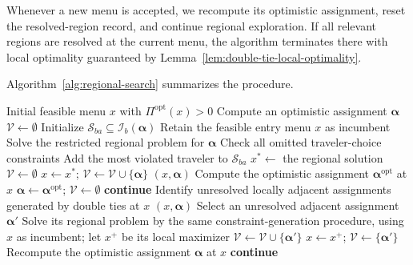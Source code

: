 \documentclass{article}
\begin{document}
Whenever a new menu is accepted, we recompute its optimistic assignment,
reset the resolved-region record, and continue regional exploration.
If all relevant regions are resolved at the current menu, the algorithm
terminates there with local optimality guaranteed by
Lemma~\ref{lem:double-tie-local-optimality}.

Algorithm~\ref{alg:regional-search} summarizes the procedure.

\begin{algorithm}[t]
\caption{Regional search under optimistic selection}
\label{alg:regional-search}
\begin{algorithmic}[1]
\Require Initial feasible menu $x$ with $\Pi^{\mathrm{opt}}(x)>0$
\State Compute an optimistic assignment $\bm\alpha$
\State $\mathcal V\gets\emptyset$ 
        \State Initialize $\mathcal S_{ba}\subseteq\mathcal I_b(\bm\alpha)$
        \State Retain the feasible entry menu $x$ as incumbent
        \Repeat
            \State Solve the restricted regional problem for $\bm\alpha$
            \State Check all omitted traveler-choice constraints
                \State Add the most violated traveler to $\mathcal S_{ba}$
            \EndFor
        \State $x^*\gets$ the regional solution
            \State $\mathcal V\gets\emptyset$
        \EndIf
        \State $x\gets x^*$; $\mathcal V\gets\mathcal V\cup\{\bm\alpha\}$
    \EndIf
        \State \Return $(x,\bm\alpha)$ 
    \EndIf
    \State Compute the optimistic assignment $\bm\alpha^{\mathrm{opt}}$ at $x$
        \State $\bm\alpha\gets\bm\alpha^{\mathrm{opt}}$;
        $\mathcal V\gets\emptyset$
        \State \textbf{continue}
    \EndIf
    \State Identify unresolved locally adjacent assignments generated by
    double ties at $x$
        \State \Return $(x,\bm\alpha)$
    \EndIf
    \State Select an unresolved adjacent assignment $\bm\alpha'$
    \State Solve its regional problem by the same constraint-generation
    procedure, using $x$ as incumbent; let $x^+$ be its local maximizer
        \State $\mathcal V\gets\mathcal V\cup\{\bm\alpha'\}$
    \Else
        \State $x\gets x^+$; $\mathcal V\gets\{\bm\alpha'\}$
        \State Recompute the optimistic assignment $\bm\alpha$ at $x$
        \State \textbf{continue}
    \EndIf
\EndWhile
\end{algorithmic}
\end{algorithm}
\end{document}
